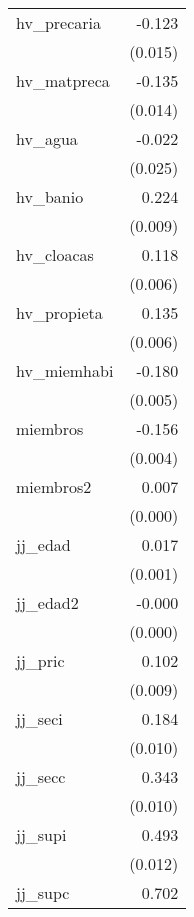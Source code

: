 {\begin{longtable}{l*{1}{D{.}{.}{-1}}}
hv\_precaria &      -0.123\sym{***}\\
            &     (0.015)         \\
\addlinespace
hv\_matpreca &      -0.135\sym{***}\\
            &     (0.014)         \\
\addlinespace
hv\_agua     &      -0.022         \\
            &     (0.025)         \\
\addlinespace
hv\_banio    &       0.224\sym{***}\\
            &     (0.009)         \\
\addlinespace
hv\_cloacas  &       0.118\sym{***}\\
            &     (0.006)         \\
\addlinespace
hv\_propieta &       0.135\sym{***}\\
            &     (0.006)         \\
\addlinespace
hv\_miemhabi &      -0.180\sym{***}\\
            &     (0.005)         \\
\addlinespace
miembros    &      -0.156\sym{***}\\
            &     (0.004)         \\
\addlinespace
miembros2   &       0.007\sym{***}\\
            &     (0.000)         \\
\addlinespace
jj\_edad     &       0.017\sym{***}\\
            &     (0.001)         \\
\addlinespace
jj\_edad2    &      -0.000\sym{***}\\
            &     (0.000)         \\
\addlinespace
jj\_pric     &       0.102\sym{***}\\
            &     (0.009)         \\
\addlinespace
jj\_seci     &       0.184\sym{***}\\
            &     (0.010)         \\
\addlinespace
jj\_secc     &       0.343\sym{***}\\
            &     (0.010)         \\
\addlinespace
jj\_supi     &       0.493\sym{***}\\
            &     (0.012)         \\
\addlinespace
jj\_supc     &       0.702\sym{***}\\

\end{longtable}}
